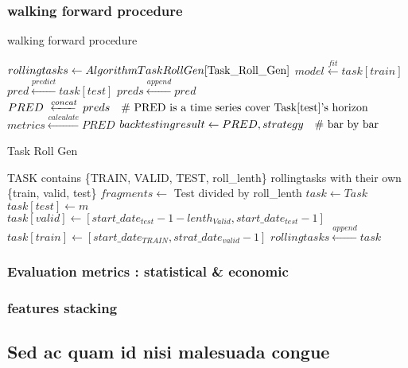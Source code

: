 \documentclass[10pt,letterpaper]{article}
\begin{document}
\subsubsection*{walking forward procedure}
\begin{algorithm}
        \caption{walking forward procedure}
        \begin{algorithmic}
            \STATE $rollingtasks \gets Algorithm TaskRollGen\ref{Task_Roll_Gen}$
            \STATE $model \xleftarrow{fit} task[train]$
            \STATE $pred \xleftarrow{predict} task[test]$
            \STATE $preds \xleftarrow{append} pred$
            \ENDFOR
            \STATE $PRED \xleftarrow{concat} preds \text{\quad \# PRED is a time series cover Task[test]'s horizon}$
            \STATE $metrics \xleftarrow{calculate} PRED$
            \STATE $backtestingresult \gets PRED, strategy \text{\quad \# bar by bar}$
        \end{algorithmic}
\end{algorithm}
\begin{algorithm}
	\renewcommand{\algorithmicrequire}{\textbf{Input:}}
	\renewcommand{\algorithmicensure}{\textbf{Output:}}
	\caption{Task Roll Gen}
	\label{Task_Roll_Gen}
	\begin{algorithmic}
    	\REQUIRE TASK contains \{TRAIN, VALID, TEST, roll\_lenth\}
            \ENSURE rollingtasks with their own \{train, valid, test\}
            \STATE $fragments \gets$ Test divided by roll\_lenth
            \STATE $task \gets Task$
            \STATE $task[test] \gets m$
            \STATE $task[valid] \gets [start\_date_{test} - 1 - lenth_{Valid}, start\_date_{test} - 1]$
            \STATE $task[train] \gets [start\_date_{TRAIN}, strat\_date_{valid} - 1]$ 
            \STATE $rollingtasks \xleftarrow{append} task$
            \ENDFOR
	\end{algorithmic}
\end{algorithm}
\subsubsection*{Evaluation metrics : statistical \& economic}

\subsubsection*{features stacking}

\subsection*{Sed ac quam id nisi malesuada congue}
\end{document}
